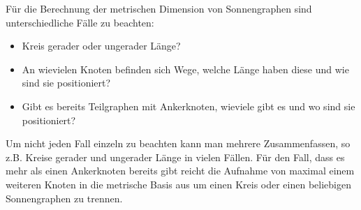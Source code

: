 Für die Berechnung der metrischen Dimension von Sonnengraphen sind unterschiedliche Fälle zu beachten:
\begin{itemize}
\item Kreis gerader oder ungerader Länge?
\item An wievielen Knoten befinden sich Wege, welche Länge haben diese und wie sind sie positioniert?
\item Gibt es bereits Teilgraphen mit Ankerknoten, wieviele gibt es und wo sind sie positioniert?
\end{itemize}
Um nicht jeden Fall einzeln zu beachten kann man mehrere Zusammenfassen, so z.B. Kreise gerader und ungerader Länge in vielen Fällen.
Für den Fall, dass es mehr als einen Ankerknoten bereits gibt reicht die Aufnahme von maximal einem weiteren Knoten in die metrische Basis aus um einen Kreis oder einen beliebigen Sonnengraphen zu trennen.

